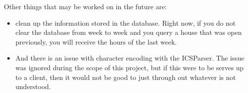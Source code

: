 \documentclass[letterpaper,11pt]{report}
\theoremstyle{definition}
\theoremstyle{definition}
\begin{document}
\hspace*{-2.5em} Other things that may be worked on in the future are:
\begin{itemize}
  \item clean up the information stored in the database. Right now, if you do not clear the database from week to week and you query a house that was open previously, you will receive the hours of the last week.
  \item And there is an issue with character encoding with the ICSParser. The issue was ignored during the scope of this project, but if this were to be serves up to a client, then it would not be good to just through out whatever is not understood.
\end{itemize}






\end{document}
